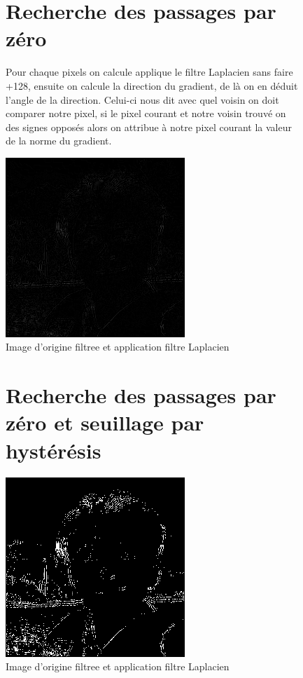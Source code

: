 \documentclass{article}
\begin{document}
\begin{figure}[h!]
\section{Recherche des passages par zéro}
Pour chaque pixels on calcule applique le filtre Laplacien sans faire +128, ensuite on calcule la direction du gradient, de là on en déduit l'angle de la direction. Celui-ci nous dit avec quel voisin on doit comparer notre pixel, si le pixel courant et notre voisin trouvé on des signes opposés alors on attribue à notre pixel courant la valeur de la norme du gradient.

\centerline{\includegraphics[scale=1.]{./rendus/MOIMOIETMOIfiltreePassagepar0.png}}
\caption{Image d'origine filtree et application filtre Laplacien}
\end{figure}

\begin{figure}[h!]
\section{Recherche des passages par zéro et seuillage par hystérésis}

\centerline{\includegraphics[scale=1.]{./rendus/MOIMOIETMOIfiltreePassagepar0Hysteresis.png}}
\caption{Image d'origine filtree et application filtre Laplacien}
\end{figure}
\end{document}
